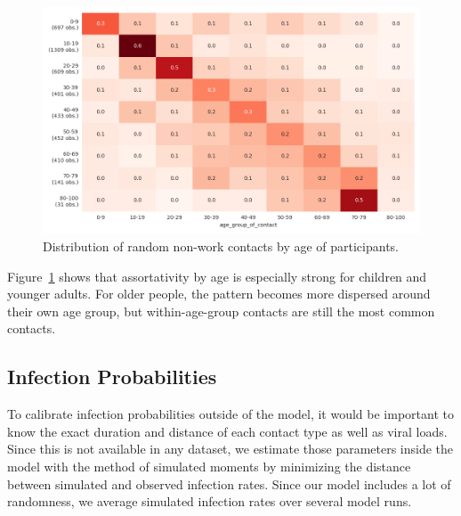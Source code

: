 \begin{figure}[ht]
    \centering
    \includegraphics[width=0.9 \textwidth]{../figures/assortative_matching_probability_example}
    \caption{Distribution of random non-work contacts by age of participants.}
    \label{fig:assortativity}
\end{figure}

Figure~\ref{fig:assortativity} shows that assortativity by age is especially strong for
children and younger adults. For older people, the pattern becomes more dispersed around
their own age group, but within-age-group contacts are still the most common contacts.

\FloatBarrier


\subsection{Infection Probabilities}
\label{sec:estimation}

To calibrate infection probabilities outside of the model, it would be important to know
the exact duration and distance of each contact type as well as viral loads. Since this
is not available in any dataset, we estimate those parameters inside the model with the
method of simulated moments \citep{McFadden1989} by minimizing the distance between
simulated and observed infection rates. Since our model includes a lot of randomness, we
average simulated infection rates over several model runs.

